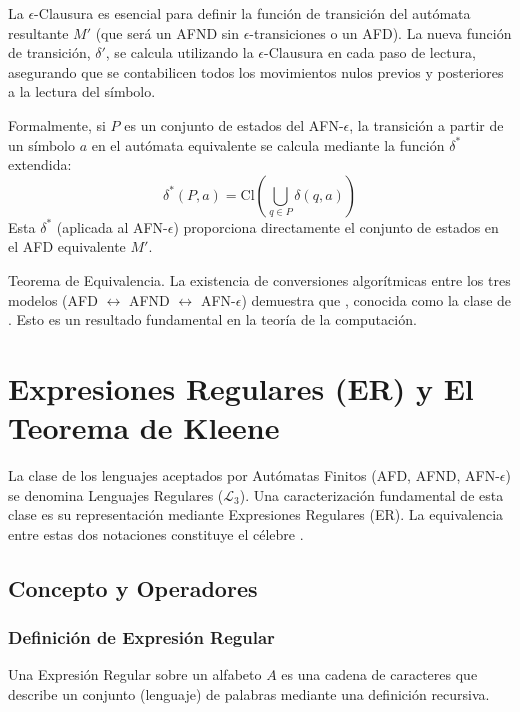 La $\epsilon$-Clausura es esencial para definir la función de transición del autómata resultante $M'$ (que será un AFND sin $\epsilon$-transiciones o un AFD). La nueva función de transición, $\delta'$, se calcula utilizando la $\epsilon$-Clausura en cada paso de lectura, asegurando que se contabilicen todos los movimientos nulos previos y posteriores a la lectura del símbolo.

Formalmente, si $P$ es un conjunto de estados del AFN-$\epsilon$, la transición a partir de un símbolo $a$ en el autómata equivalente se calcula mediante la función $\delta^*$ extendida:
\[ \delta^*(P, a) = \text{Cl}\left( \bigcup_{q \in P} \delta(q, a) \right) \]
Esta $\delta^*$ (aplicada al AFN-$\epsilon$) proporciona directamente el conjunto de estados en el AFD equivalente $M'$.

\begin{anotacion}{Teorema de Equivalencia.}
La existencia de conversiones algorítmicas entre los tres modelos (AFD $\leftrightarrow$ AFND $\leftrightarrow$ AFN-$\epsilon$) demuestra que , conocida como la clase de . Esto es un resultado fundamental en la teoría de la computación.
\end{anotacion}


\section{Expresiones Regulares (ER) y El Teorema de Kleene} %

La clase de los lenguajes aceptados por Autómatas Finitos (AFD, AFND, AFN-$\epsilon$) se denomina Lenguajes Regulares ($\mathcal{L}_3$). Una caracterización fundamental de esta clase es su representación mediante Expresiones Regulares (ER). La equivalencia entre estas dos notaciones constituye el célebre .

\subsection{Concepto y Operadores} %

\subsubsection{Definición de Expresión Regular}

Una Expresión Regular sobre un alfabeto $A$ es una cadena de caracteres que describe un conjunto (lenguaje) de palabras mediante una definición recursiva.

